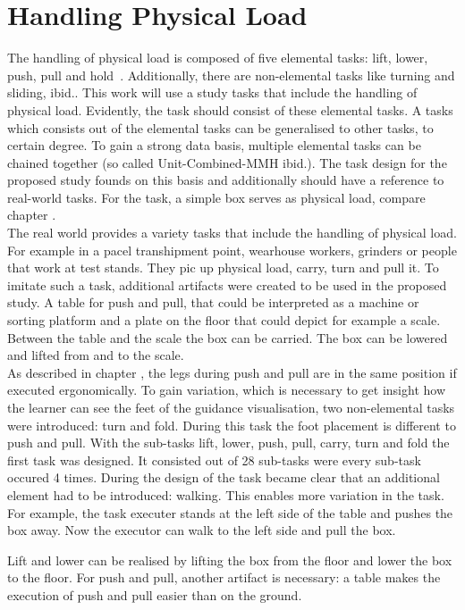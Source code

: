 \section{Handling Physical Load}
\label{handlingphysicalload}
The handling of physical load is composed of five elemental tasks: lift, lower, push, pull and hold~\cite{mmh}. Additionally, there are non-elemental tasks like turning and sliding, ibid.. This work will use a study tasks that include the handling of physical load. Evidently, the task should consist of these elemental tasks. A tasks which consists out of the elemental tasks can be generalised to other tasks, to certain degree. To gain a strong data basis, multiple elemental tasks can be chained together (so called Unit-Combined-MMH ibid.). The task design for the proposed study founds on this basis and additionally should have a reference to real-world tasks. For the task, a simple box serves as physical load, compare chapter .\\
The real world provides a variety tasks that include the handling of physical load. For example in a pacel transhipment point, wearhouse workers, grinders or people that work at test stands. They pic up physical load, carry, turn and pull it. To imitate such a task, additional artifacts were created to be used in the proposed study. A table for push and pull, that could be interpreted as a machine or sorting platform and a plate on the floor that could depict for example a scale. Between the table and the scale the box can be carried. The box can be lowered and lifted from and to the scale.\\
As described in chapter , the legs during push and pull are in the same position if executed ergonomically. To gain variation, which is necessary to get insight how the learner can see the feet of the guidance visualisation, two non-elemental tasks were introduced: turn and fold. During this task the foot placement is different to push and pull. With the sub-tasks lift, lower, push, pull, carry, turn and fold the first task was designed. It consisted out of 28 sub-tasks were every sub-task occured 4 times. During the design of the task became clear that an additional element had to be introduced: walking. This enables more variation in the task. For example, the task executer stands at the left side of the table and pushes the box away. Now the executor can walk to the left side and pull the box.


Lift and lower can be realised by lifting the box from the floor and lower the box to the floor. For push and pull, another artifact is necessary: a table makes the execution of push and pull easier than on the ground.



